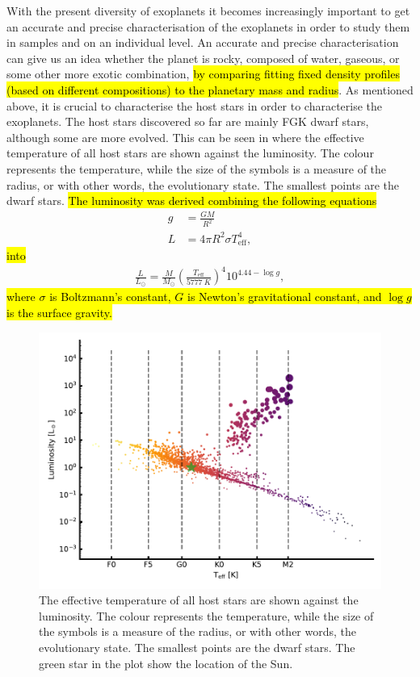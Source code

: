 With the present diversity of exoplanets it becomes increasingly important to get an accurate and
precise characterisation of the exoplanets in order to study them in samples and on an individual
level. An accurate and precise characterisation can give us an idea whether the planet is rocky,
composed of water, gaseous, or some other more exotic combination, \hl{by comparing fitting fixed
density profiles (based on different compositions) to the planetary mass and radius}. As mentioned
above, it is crucial to characterise the host stars in order to characterise the exoplanets. The
host stars discovered so far are mainly FGK dwarf stars, although some are more evolved. This can be
seen in  where the effective temperature of all host stars are shown
against the luminosity. The colour represents the temperature, while the size of the symbols is a
measure of the radius, or with other words, the evolutionary state. The smallest points are the
dwarf stars. \hl{The luminosity was derived combining the following equations}
\begin{align*}
  g &= \frac{GM}{R^2} \\
  L &= 4\pi R^2 \sigma T_\mathrm{eff}^4,
\end{align*}
\hl{into}
\begin{align}
  \frac{L}{L_\odot} = \frac{M}{M_\odot} \left(\frac{T_\mathrm{eff}}{\SI{5777}{K}}\right)^4 10^{4.44-\log g},
\end{align}
\hl{where $\sigma$ is Boltzmann's constant, $G$ is Newton's gravitational constant, and $\log g$ is
the surface gravity.}

\begin{figure}[htpb!]
    \centering
    \includegraphics[width=1.0\linewidth]{figures/hostDistribution.pdf}
    \caption{The effective temperature of all host stars are shown against the luminosity. The
             colour represents the temperature, while the size of the symbols is a measure of the
             radius, or with other words, the evolutionary state. The smallest points are the dwarf
             stars. The green star in the plot show the location of the Sun.}
    \label{fig:hostDistribution}
\end{figure}


